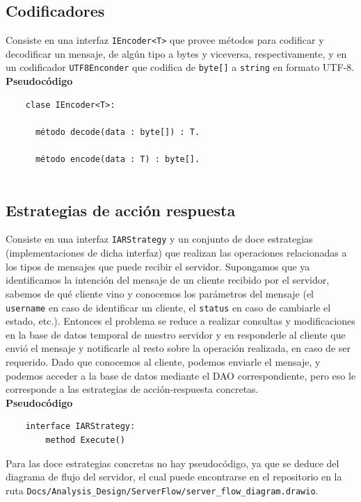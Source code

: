 \subsection{Codificadores}

Consiste en una interfaz \texttt{IEncoder<T>} que provee métodos para codificar y decodificar un mensaje, de algún tipo a bytes y viceversa, respectivamente, y en un codificador \texttt{UTF8Enconder} que codifica de \texttt{byte[]} a \texttt{string} en formato UTF-8.
\\

\textbf{Pseudocódigo}
\begin{verbatim}
	clase IEncoder<T>:
	  
	  método decode(data : byte[]) : T.
	     
	  método encode(data : T) : byte[].
	    
\end{verbatim}

\subsection{Estrategias de acción respuesta}
Consiste en una interfaz \texttt{IARStrategy} y un conjunto de doce estrategias (implementaciones de dicha interfaz) que realizan las operaciones relacionadas a los tipos de mensajes que puede recibir el servidor. Supongamos que ya identificamos la intención del mensaje de un cliente recibido por el servidor, sabemos de qué cliente vino y conocemos los parámetros del mensaje (el \texttt{username} en caso de identificar un cliente, el \texttt{status} en caso de cambiarle el estado, etc.). Entonces el problema se reduce a realizar consultas y modificaciones en la base de datos temporal de nuestro servidor y en responderle al cliente que envió el mensaje y notificarle al resto sobre la operación realizada, en caso de ser requerido. Dado que conocemos al cliente, podemos enviarle el mensaje, y podemos acceder a la base de datos mediante el DAO correspondiente, pero eso le corresponde a las estrategias de acción-respuesta concretas.
\\

\textbf{Pseudocódigo}
\begin{verbatim}
	interface IARStrategy:
		method Execute()
\end{verbatim}
Para las doce estrategias concretas no hay pseudocódigo, ya que se deduce del diagrama de flujo del servidor, el cual puede encontrarse en el repositorio en la ruta \texttt{Docs/Analysis\_Design/ServerFlow/server\_flow\_diagram.drawio}.

